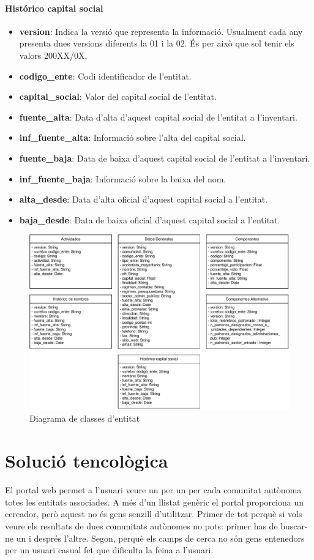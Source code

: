 \documentclass[12pt]{article}
\begin{document}
\paragraph{Histórico capital social\\}
\begin{itemize}
    \item \textbf{version}: Indica la versió que representa la informació. Usualment cada any presenta dues versions diferents la 01 i la 02. És per això que sol tenir els valors 200XX/0X.
    \item \textbf{codigo\_ente}: Codi identificador de l'entitat.
    \item \textbf{capital\_social}: Valor del capital social de l'entitat.
    \item \textbf{fuente\_alta}: Data d'alta d'aquest capital social de l'entitat a l'inventari.
    \item \textbf{inf\_fuente\_alta}: Informació sobre l'alta del capital social.
    \item \textbf{fuente\_baja}: Data de baixa d'aquest capital social de l'entitat a l'inventari.
    \item \textbf{inf\_fuente\_baja}: Informació sobre la baixa del nom.
    \item \textbf{alta\_desde}: Data d'alta oficial d'aquest capital social a l'entitat.
    \item \textbf{baja\_desde}: Data de baixa oficial d'aquest capital social a l'entitat.
\end{itemize}

\begin{figure}[H]
    \centering
    \includegraphics[width=0.7\columnwidth]{img/diagrama_classes_entitat.pdf}
    \caption{Diagrama de classes d'entitat} 
    \label{clasesentitat}
\end{figure}

\section*{Solució tencològica}
El portal web permet a l'usuari veure un per un per cada comunitat autònoma totes les entitats associades. A més d'un llistat genèric el portal proporciona un cercador, però aquest no és gens senzill d'utilitzar. Primer de tot perquè si vols veure els resultats de dues comunitats autònomes no pots: primer has de buscar-ne un i després l'altre. Segon, perquè els camps de cerca no són gens entenedors per un usuari casual fet que dificulta la feina a l'usuari.\par
\end{document}
